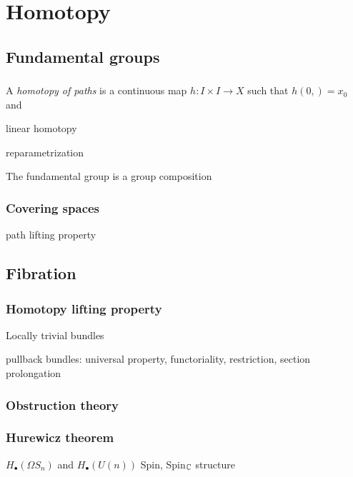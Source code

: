 \documentclass{../../large}
\begin{document}
\part{Homotopy}

\chapter{Fundamental groups}

\section{}
\begin{prb}
A \emph{homotopy of paths} is a continuous map $h:I\times I\to X$ such that $h(0,)=x_0$ and 
\begin{parts}
\item linear homotopy
\item reparametrization
\end{parts}
\end{prb}
\begin{prb}
The fundamental group is a group
composition
\end{prb}

\begin{prb}
\end{prb}

\section{Covering spaces}

path lifting property




\chapter{Fibration}
\section{Homotopy lifting property}


Locally trivial bundles

pullback bundles: universal property, functoriality, restriction,
section prolongation

\section{Obstruction theory}
\section{Hurewicz theorem}
$H_\bullet(\Omega S_n)$ and $H_\bullet(U(n))$
Spin, Spin$_{\mathbb{C}}$ structure
\end{document}

